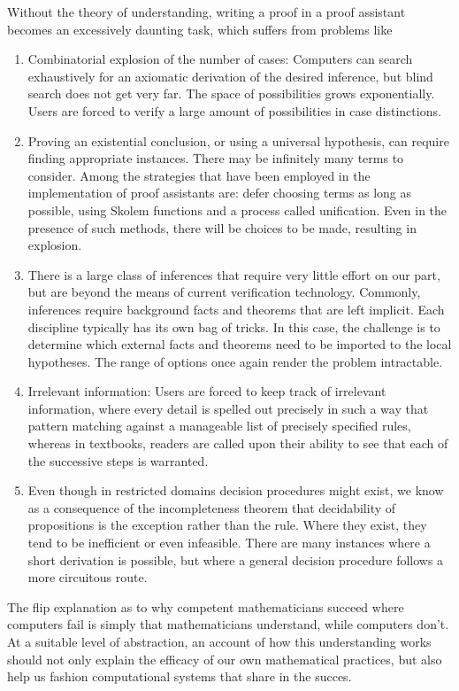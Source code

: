 \documentclass{article}
\begin{document}
Without the theory of 
understanding, writing a proof in a proof assistant becomes an excessively
daunting task, which suffers from problems like
\begin{enumerate}
\item Combinatorial explosion of the number of cases: Computers
can search exhaustively for an axiomatic derivation of the desired inference,
but blind search does not get very far. The space of possibilities grows
exponentially. Users are forced to verify a large amount of possibilities in 
case distinctions.
\item Proving an existential conclusion, or using a universal hypothesis, can
require finding appropriate instances. There may be infinitely many terms to
consider. Among the strategies that have been employed in the implementation
of proof assistants are: defer choosing terms as long as possible, using
Skolem functions and a process called unification. Even in the presence of such
methods, there will be choices to be made, resulting in explosion.
\item There is a large class of inferences that require very little effort on
our part, but are beyond the means of current verification technology.
Commonly, inferences require background facts and theorems
that are left implicit. Each discipline typically has its own bag of tricks. 
In this case, the challenge is to determine which
external facts and theorems need to be imported to the local hypotheses. The
range of options once again render the problem intractable. 
\item Irrelevant information: Users are forced to keep track of irrelevant
information, where every detail is spelled out precisely in such a way that
pattern matching against a manageable list of precisely specified rules, whereas
in textbooks, readers are called upon their ability to see that each of the
successive steps is warranted.
\item Even though in restricted domains decision procedures might exist, we
know as a consequence of the incompleteness theorem that decidability of
propositions is the exception rather than the rule. Where they exist, they tend
to be inefficient or even infeasible. There are many instances where a short
derivation is possible, but where a general decision procedure follows a more
circuitous route.
\end{enumerate}
The flip explanation as to why competent mathematicians succeed where computers
fail is simply that mathematicians understand, while computers don't. At a
suitable level of abstraction, an account of how this understanding works should
not only explain the efficacy of our own mathematical practices, but also help
us fashion computational systems that share in the succes.
\end{document}
